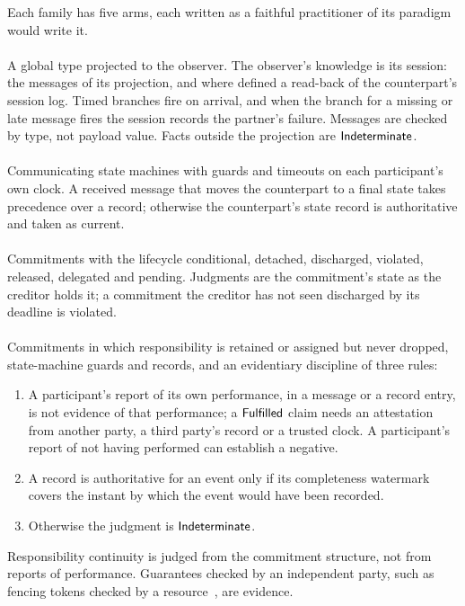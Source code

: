 Each family has five arms, each written as a faithful practitioner of its paradigm would write it.

\paragraph{} A global type projected to the observer. The observer's knowledge is its session: the messages of its projection, and where defined a read-back of the counterpart's session log. Timed branches fire on arrival, and when the branch for a missing or late message fires the session records the partner's failure. Messages are checked by type, not payload value. Facts outside the projection are $\mathsf{Indeterminate}$.

\paragraph{} Communicating state machines with guards and timeouts on each participant's own clock. A received message that moves the counterpart to a final state takes precedence over a record; otherwise the counterpart's state record is authoritative and taken as current.

\paragraph{} Commitments with the lifecycle conditional, detached, discharged, violated, released, delegated and pending. Judgments are the commitment's state as the creditor holds it; a commitment the creditor has not seen discharged by its deadline is violated.

\paragraph{} Commitments in which responsibility is retained or assigned but never dropped, state-machine guards and records, and an evidentiary discipline of three rules:
\begin{enumerate}
\item[E1] A participant's report of its own performance, in a message or a record entry, is not evidence of that performance; a $\mathsf{Fulfilled}$ claim needs an attestation from another party, a third party's record or a trusted clock. A participant's report of not having performed can establish a negative.
\item[E2] A record is authoritative for an event only if its completeness watermark covers the instant by which the event would have been recorded.
\item[E3] Otherwise the judgment is $\mathsf{Indeterminate}$.
\end{enumerate}
Responsibility continuity is judged from the commitment structure, not from reports of performance. Guarantees checked by an independent party, such as fencing tokens checked by a resource~\cite{kleppmann2017designing}, are evidence.

